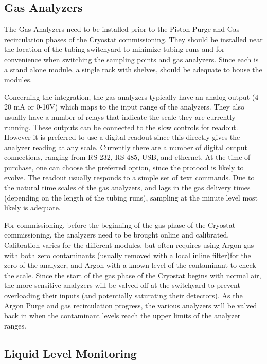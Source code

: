 \subsection{Gas Analyzers}
\label{sec:fdgen-slow-cryo-install-ga}
 
The Gas Analyzers need to be installed prior to the Piston Purge and Gas recirculation phases of the Cryostat commissioning. They should be installed near the location of the tubing switchyard to minimize tubing runs and for convenience when switching the sampling points and gas analyzers. Since each is a stand alone module, a single rack with shelves, should be adequate to house the modules.

Concerning the integration, the gas analyzers typically have an analog output (4-20 \si{mA} or 0-10\si{V}) which maps to the input range of the analyzers. They also usually have a number of relays that indicate the scale they are currently running. These outputs can be connected to the slow controls for readout. However it is preferred to use a digital readout since this directly gives the analyzer reading at any scale. Currently there are a number of digital output connections, ranging from RS-232, RS-485, USB, and ethernet. At the time of purchase, one can choose the preferred option, since the protocol is likely to evolve. The readout usually responds to a simple set of text commands. Due to the natural time scales of the gas analyzers, and lags in the gas delivery times (depending on the length of the tubing runs), sampling at the minute level most likely is adequate.

For commissioning, before the beginning of the gas phase of the Cryostat commissioning, the analyzers need to be brought online and calibrated. Calibration varies for the different modules, but often requires using Argon gas with both zero contaminants (usually removed with a local inline filter)for the zero of the analyzer, and Argon with a known level of the contaminant to check the scale. Since the start of the gas phase of the Cryostat begins with normal air, the more sensitive analyzers will be valved off at the switchyard to prevent overloading their inputs (and potentially saturating their detectors). As the Argon Purge and gas recirculation progress, the various analyzers will be valved back in when the contaminant levels reach the upper limits of the analyzer ranges. 

\subsection{Liquid Level Monitoring}
\label{sec:fdgen-slow-cryo-install-llm}


